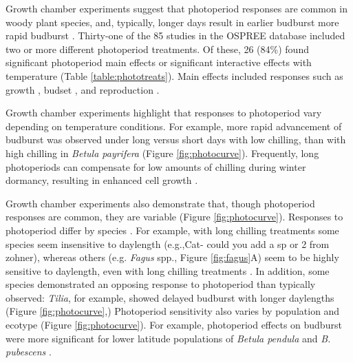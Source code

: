 \documentclass{article}
\begin{document}
\par Growth chamber experiments suggest that photoperiod responses are common in woody plant species, and, typically, longer days result in earlier budburst more rapid budburst \citep [e.g., ][]{Caffarra:2011a}. Thirty-one of the 85 studies in the OSPREE database included two or more different photoperiod treatments. Of these, 26 (84\%) found significant photoperiod main effects or significant interactive effects with temperature (Table \ref{table:phototreats}). Main effects included responses such as growth \citep[e.g., higher growth rates with longer days ][]{Ashby:1962aa}, budset \citep[e.g., more rapid induction of budset with shorter days][]{Howe:1995aa}, and reproduction \citep[e.g., increased flowering with longer days ][]{Heide:2012aa}. 
\par Growth chamber experiments highlight that responses to photoperiod vary depending on temperature conditions. For example, more rapid advancement of budburst was observed under long versus short days with low chilling, than with high chilling in \emph{Betula payrifera} \citep{Hawkins:2012} (Figure \ref{fig:photocurve}). Frequently, long photoperiods can compensate for low amounts of chilling during winter dormancy, resulting in enhanced cell growth \citep{Heide:1993,Myking:1995,Caffarra:2011b}.
\par Growth chamber experiments also demonstrate that, though photoperiod responses are common, they are variable (Figure \ref{fig:photocurve}). Responses to photoperiod differ by species \citep[e.g.,][]{Heide:1993a,Howe:1996,Basler:2012, Basler:2014aa,zohner2016,flynn2018}. For example, with long chilling treatments some species seem insensitive to daylength (e.g.,Cat- could you add a sp or 2 from zohner), whereas others (e.g. \emph{Fagus} spp., Figure \ref{fig:fagus}A) seem to be highly sensitive to daylength, even with long chilling treatments \citep{zohner2016}. In addition, some species demonstrated an opposing response to photoperiod than typically observed: \emph{Tilia}, for example, showed delayed budburst with longer daylengths (Figure \ref{fig:photocurve},\citep{Ashby:1962aa}) %
Photoperiod sensitivity also varies by population and ecotype \citep[e.g.,][]{Partanen:2005aa,flynn2018} (Figure \ref{fig:photocurve}). For example, photoperiod effects on budburst were more significant for lower latitude populations of \emph{Betula pendula} and \emph{B. pubescens} \citep{Partanen:2005aa}. 
\end{document}
